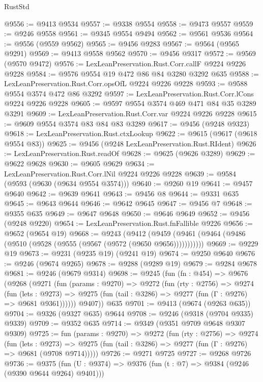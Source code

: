 \begin{lexlean}{RustStd}
\begin{coremodule}
{\begin{coremodule}
{{{{{{{{{{{{{{{{{{{{{{{{{{{{{{{{{@9556 := @9413 @9534
@9557 := @9338 @9554
@9558 := @9473 @9557
@9559 := @9246 @9558
@9561 := @9345 @9554 @9494
@9562 := @9561 @9536
@9564 := @9556 (@9559 @9562)
@9565 := @9456 @9283
@9567 := @9564 (@9565 @9291)
@9569 := @9413 @9558 @9562
@9570 := @9456 @9317
@9572 := @9569 (@9570 @9472)
@9576 := LexLeanPreservation.Rust.Corr.callF @9224 @9226 @9228
@9584 := @9576 @9554 @19 @472 @86 @84 @3280 @3292 @635
@9588 := LexLeanPreservation.Rust.Corr.opsOfL @9224 @9226 @9228
@9593 := @9588 @9554 @3574 @472 @86 @3292
@9597 := LexLeanPreservation.Rust.Corr.lCons @9224 @9226 @9228
@9605 := @9597 @9554 @3574 @469 @471 @84 @35 @3289 @3291
@9609 := LexLeanPreservation.Rust.Corr.var @9224 @9226 @9228
@9615 := @9609 @9554 @3574 @83 @84 @83 @3289
@9617 := @9456 (@9248 @9323)
@9618 := LexLeanPreservation.Rust.ctxLookup
@9622 := @9615 (@9617 (@9618 @9554 @83))
@9625 := @9456 (@9248 LexLeanPreservation.Rust.RIdent)
@9626 := LexLeanPreservation.Rust.readOf
@9628 := @9625 (@9626 @3289)
@9629 := @9622 @9628
@9630 := @9605 @9629
@9634 := LexLeanPreservation.Rust.Corr.lNil @9224 @9226 @9228
@9639 := @9584 (@9593 (@9630 (@9634 @9554 @3574)))
@9640 := @9260 @19
@9641 := @9457 @9640
@9642 := @9639 @9641
@9643 := @9456 @8
@9644 := @9331 @635
@9645 := @9643 @9644
@9646 := @9642 @9645
@9647 := @9456 @7
@9648 := @9355 @635
@9649 := @9647 @9648
@9650 := @9646 @9649
@9652 := @9456 (@9248 @9220)
@9654 := LexLeanPreservation.Rust.fnFallible @9226
@9656 := @9652 (@9654 @19)
@9668 := @9243
    (@9412 (@9459 (@9461 (@9464 (@9486 (@9510 (@9528 (@9555 (@9567 (@9572 (@9650 @9656)))))))))))
@9669 := @9229 @19
@9673 := @9231 (@9235 @19) (@9241 @19)
@9674 := @9250 @9640
@9676 := @9246 (@9674 @9265)
@9678 := @9288 (@9289 @19)
@9679 := @9284 @9678
@9681 := @9246 (@9679 @9314)
@9698 := @9245
    (fun (fn : @454) =>
    @9676
      (@9268
        (@9271
          (fun (params : @9270) =>
          @9272
            (fun (rty : @2756) =>
            @9274
              (fun (lets : @9273) =>
              @9275 (fun (tail : @3286) => @9277 (fun (Γ : @9276) => @9681 @9361))))))
        @9407))
    @635
@9701 := @9413 (@9674 (@9263 @635))
@9704 := @9326 (@9327 @635) @9644
@9708 := @9246 (@9318 (@9704 @9335) @9339)
@9709 := @9352 @635
@9714 := @9349 (@9351 @9709 @9648 @9307 @9309)
@9725 := fun (params : @9270) =>
  @9272
    (fun (rty : @2756) =>
    @9274
      (fun (lets : @9273) =>
      @9275 (fun (tail : @3286) => @9277 (fun (Γ : @9276) => @9681 (@9708 @9714)))))
@9726 := @9271 @9725
@9727 := @9268 @9726
@9736 := @9375 (fun (U : @9374) => @9376 (fun (t : @7) => @9384 (@9246 (@9390 @9644 @9264) @9401)))
}}}}}}}}}}}}}}}}}}}}}}}}}}}}}}}}}
\end{coremodule}}
\end{coremodule}
\end{lexlean}
